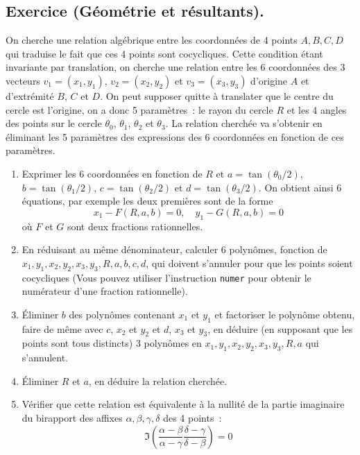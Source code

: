 \documentclass[a4paper,11pt]{article}
\begin{document}
\begin{giacjshere}
\subsection{Exercice (G\'eom\'etrie et r\'esultants).}
On cherche une relation alg\'ebrique entre les coordonn\'ees de 4 points
$A,B,C,D$ qui traduise le fait que ces 4 points sont cocycliques. Cette
condition \'etant invariante par translation, on cherche une
relation entre les 6 coordonn\'ees des 3 vecteurs $v_1=(x_1,y_1)$, 
$v_2=(x_2,y_2)$ et $v_3=(x_3,y_3)$ 
d'origine $A$ et d'extr\'emit\'e $B$, $C$ et $D$.
On peut supposer quitte \`a translater que le centre du cercle est
l'origine, on a donc 5 param\`etres~: le rayon du cercle $R$ et les
4 angles des points sur le cercle $\theta_0$, $\theta_1$, $\theta_2$ et
$\theta_3$. La relation cherch\'ee va s'obtenir en \'eliminant les
5 param\`etres des expressions des 6 coordonn\'ees en fonction de
ces param\`etres.
\begin{enumerate}
\item Exprimer les 6 coordonn\'ees en fonction de 
$R$ et $a=\tan(\theta_0/2)$, $b=\tan(\theta_1/2)$, $c=\tan(\theta_2/2)$
et $d=\tan(\theta_3/2)$. On obtient ainsi 6 \'equations, par exemple les
deux premi\`eres sont de la forme
\[ x_1- F(R,a,b)= 0, \quad y_1- G(R,a,b)= 0 \]
o\`u $F$ et $G$ sont deux fractions rationnelles.
\item En r\'eduisant au m\^eme d\'enominateur, calculer 6 
polyn\^omes, fonction de
$x_1,y_1,x_2,y_2,x_3,y_3,R,a,b,c,d$, qui doivent s'annuler
pour que les points soient cocycliques
(Vous pouvez utiliser l'instruction \verb|numer| pour obtenir le
num\'erateur d'une fraction rationnelle).
\item \'Eliminer $b$ des polyn\^omes
contenant $x_1$ et $y_1$ et factoriser
le polyn\^ome obtenu, faire de m\^eme avec $c$, $x_2$ et $y_2$
et $d$, $x_3$ et $y_3$, en d\'eduire (en supposant que les points sont
tous distincts) 3 polyn\^omes en $x_1,y_1,x_2,y_2,x_3,y_3,R,a$ qui
s'annulent.
\item \'Eliminer $R$ et $a$, en d\'eduire la relation cherch\'ee.
\item V\'erifier que cette relation est \'equivalente \`a la nullit\'e
de la partie imaginaire du birapport des affixes $\alpha, \beta, \gamma,
\delta$ des 4 points~:
\[ \Im \left( \frac{\alpha-\beta}{\alpha-\gamma}
\frac{\delta-\gamma}{\delta-\beta} \right) = 0\]
\end{enumerate}



\end{giacjshere}
\end{document}
